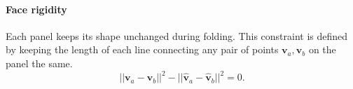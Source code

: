 

\paragraph{Face rigidity} 
Each panel keeps its shape unchanged during folding. This constraint is defined by keeping the length of each line connecting any pair of points $\mathbf{v}_{a}, \mathbf{v}_{b}$ on the panel the same.
\begin{equation}
||\mathbf{v}_{a} - \mathbf{v}_{b}||^2 - ||\hat{\mathbf{v}}_{a} - \hat{\mathbf{v}}_{b}||^2 = 0.
\label{equ:plane}
\end{equation}




